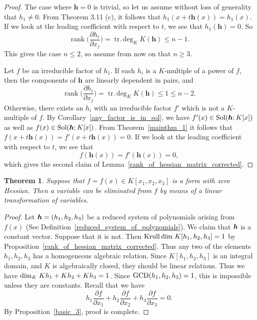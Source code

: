 \documentclass[12pt]{article}
\newtheorem{theorem}{Theorem}[section]
\theoremstyle{definition}
\theoremstyle{remark}
\def\dim{{\rm dim}}
\def\sol{{\rm Sol}}
\def\boldh{\mbox{\boldmath $h$}}
\def\pa{\partial}
\def\rk{\operatorname{rank}}
\def\trdeg{\operatorname{tr.\,deg}}
\begin{document}
\begin{proof}
The case where $\bm{h} = 0$ is trivial, so let us assume without loss of 
generality that $h_1 \ne 0$. From Theorem 3.11 (c), it follows that
$h_1(x+t\bm{h}(x)) = h_1(x)$. If we look at the leading coefficient with respect to
$t$, we see that $h_1(\bm{h}) = 0$. So
$$
\rk \Big(\frac{\partial h_i}{\partial x_j}\Big) = \trdeg_K K(\bm{h}) \le n-1. 
$$
This gives the case $n \le 2$, so assume from now on that $n \ge 3$.

Let $f$ be an irreducible factor of $h_1$. If each $h_i$ is a $K$-multiple 
of a power of $f$, then the components of $\bm{h}$ are linearly dependent
in pairs, and
$$
\rk \Big(\frac{\partial h_i}{\partial x_j}\Big) = \trdeg_K K(\bm{h}) \le 1 \le n - 2. 
$$
Otherwise, there exists an $h_i$ with an irreducible factor $f'$ which is 
not a $K$-multiple of $f$.
By Corollary~\ref{any_factor_is_in_sol},
we have $f'(x) \in \sol(\boldh; K[x])$ as well as  $f(x) \in \sol(\boldh; K[x])$.
From Theorem~\ref{mainthm_1}  it follows that   
$f(x+t\bm{h}(x)) = f'(x+t\bm{h}(x)) = 0$.  If we look at the leading coefficient 
with respect to $t$, we see that 
\begin{equation} \label{fh0} 
f(\bm{h}(x)) = f'(\bm{h}(x)) = 0,  
\end{equation}
which gives the second claim of Lemma~\ref{rank_of_hessian_matrix_corrected}.
\end{proof}

\begin{theorem} \label{ternary_form_with_zero_hessian_is_trivial}  %
Suppose that $f=f(x) \in K[x_1, x_2, x_3]$ is a form with zero Hessian.  Then 
a variable can be eliminated from $f$ by means of a linear transformation of variables. 
\end{theorem}

\begin{proof}
Let $\boldh=(h_1, h_2, h_3)$  be a reduced system of polynomials arising from $f(x)$ 
(See Definition~\ref{reduced_system_of_polynomials}).  We claim that 
$\boldh$ is  a constant vector. Suppose that it is not. 
Then ${\rm Krull\,dim}\;K[h_1, h_2, h_3]=1$ by Proposition~\ref{rank_of_hessian_matrix_corrected}. 
Thus  any two of the elements $h_1, h_2, h_3$ has a homogeneous algebraic relation. 
Since $K[h_1, h_2, h_3]$ 
is an integral domain, and $K$ is algebraically closed,  they  should be  linear relations. Thus we have 
$\dim _K\; Kh_1 + Kh_2 + Kh_3=1$.  Since ${\rm GCD}(h_1, h_2, h_3)=1$, this is impossible unless they are  constants. 
Recall that we have 
\[h_1\frac{\pa f}{\pa x_1}+ h_2\frac{\pa f}{\pa x_2}+ h_3\frac{\pa f}{\pa x_3}=0.\]
By Proposition~\ref{basic_3}, proof is complete. 
\end{proof}
\end{document}
